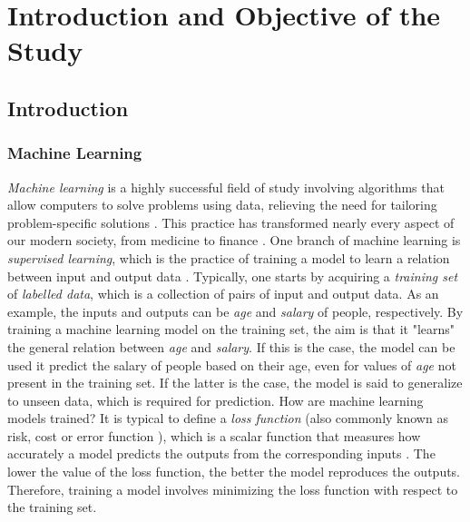 \chapter{Introduction and Objective of the Study}

\section{Introduction}\label{sec:Introduction}

\subsection{Machine Learning}\label{sec:Machine Learning Intro}


\emph{Machine learning} is a highly successful field of study involving algorithms that allow computers to solve problems using data, relieving the need for tailoring problem-specific solutions \cite{SupervisedwquantumComputers}. This practice has transformed nearly every aspect of our modern society, from medicine \cite{medicine} to finance \cite{finance}. One branch of machine learning is \emph{supervised learning}, which is the practice of training a model to learn a relation between input and output data \cite{hastie01statisticallearning}. Typically, one starts by acquiring a \emph{training set} of \emph{labelled data}, which is a collection of pairs of input and output data. As an example, the inputs and outputs can be \emph{age} and \emph{salary} of people, respectively. By training a machine learning model on the training set, the aim is that it "learns" the general relation between \emph{age} and \emph{salary}. If this is the case, the model can be used it predict the salary of people based on their age, even for values of \emph{age} not present in the training set. If the latter is the case, the model is said to generalize to unseen data, which is required for prediction. How are machine learning models trained? It is typical to define a \emph{loss function} (also commonly known as risk, cost or error function \citet{}), which is a scalar function that measures how accurately a model predicts the outputs from the corresponding inputs \cite{hastie01statisticallearning}. The lower the value of the loss function, the better the model reproduces the outputs. Therefore, training a model involves minimizing the loss function with respect to the training set.

